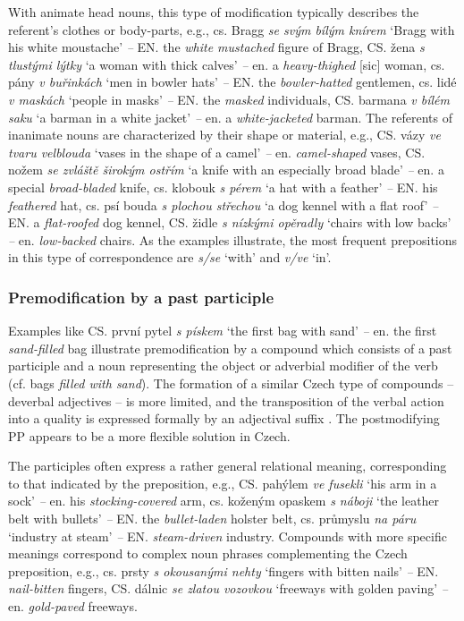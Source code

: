 \documentclass[output=paper]{langscibook}
\begin{document}
With animate head nouns, this type of modification typically describes the referent’s clothes or body-parts, e.g., cs. Bragg \textit{se svým bílým knírem} ‘Bragg with his white moustache’ \textit{–} EN. the \textit{white mustached} figure of Bragg, CS. žena \textit{s tlustými lýtky} ‘a woman with thick calves’ \textit{–} en. a \textit{heavy-thighed} [sic] woman, cs. pány \textit{v buřinkách} ‘men in bowler hats’ \textit{–} EN. the \textit{bowler-hatted} gentlemen, cs. lidé \textit{v maskách} ‘people in masks’ \textit{–} EN. the \textit{masked} individuals,  CS. barmana \textit{v bílém saku} ‘a barman in a white jacket’ \textit{–} en. a \textit{white-jacketed} barman. The referents of inanimate nouns are characterized by their shape or material, e.g., CS. vázy \textit{ve tvaru velblouda} ‘vases in the shape of a camel’ \textit{–} en. \textit{camel-shaped} vases, CS. nožem \textit{se zvláště širokým ostřím} ‘a knife with an especially broad blade’ \textit{–} en. a special \textit{broad-bladed} knife, cs. klobouk \textit{s pérem} ‘a hat with a feather’ \textit{–} EN. his \textit{feathered} hat, cs. psí bouda \textit{s plochou střechou} ‘a dog kennel with a flat roof’ \textit{–} EN. a \textit{flat-roofed} dog kennel, CS. židle \textit{s nízkými opěradly} ‘chairs with low backs’ \textit{–} en. \textit{low-backed} chairs. As the examples illustrate, the most frequent prepositions in this type of correspondence are \textit{s/se} ‘with’ and \textit{v/ve} ‘in’.

\subsubsection{Premodification by a past participle}

Examples like CS. první pytel \textit{s pískem} ‘the first bag with sand’ \textit{–} en. the first \textit{sand-filled} bag illustrate premodification by a compound which consists of a past participle and a noun representing the object or adverbial modifier of the verb (cf. bags \textit{filled with sand}).  The formation of a similar Czech type of compounds – deverbal adjectives – is more limited, and the transposition of the verbal action into a quality is expressed formally by an adjectival suffix \citep[133ff.]{bozdechova_tvoreni_1994}. The postmodifying PP appears to be a more flexible solution in Czech.

The participles often express a rather general relational meaning, corresponding to that indicated by the preposition, e.g., CS. pahýlem \textit{ve fusekli} ‘his arm in a sock’ \textit{–} en. his \textit{stocking-covered} arm, cs. koženým opaskem \textit{s náboji} ‘the leather belt with bullets’ \textit{–} EN. the \textit{bullet-laden} holster belt, cs. průmyslu \textit{na páru} ‘industry at steam’ \textit{–} EN. \textit{steam-driven} industry. Compounds with more specific meanings correspond to complex noun phrases complementing the Czech preposition, e.g., cs. prsty \textit{s okousanými nehty} ‘fingers with bitten nails’ \textit{–} EN. \textit{nail-bitten} fingers, CS. dálnic \textit{se zlatou vozovkou} ‘freeways with golden paving’ \textit{–} en. \textit{gold-paved} freeways.
\end{document}

